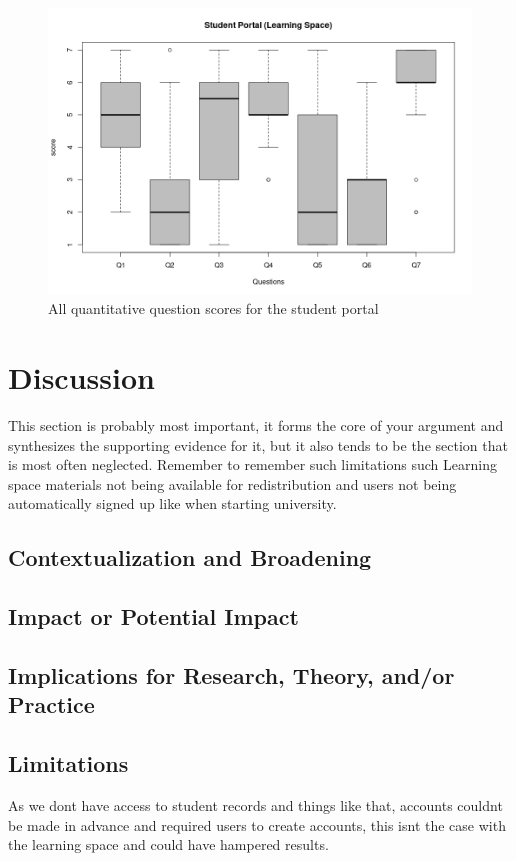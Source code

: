 \documentclass[lettersize,journal]{IEEEtran}
\begin{document}
\begin{figure}[h!]
	\includegraphics[width=\linewidth]{images/StudentPortalFull.png}
	\caption{All quantitative question scores for the student portal}
	\label{figure 4}
\end{figure}

\section{Discussion}

This section is probably most important, it forms the core of your argument and synthesizes the supporting evidence for it, but it also tends to be the section that is most often neglected. Remember to remember such limitations such Learning space materials not being available for redistribution and users not being automatically signed up like when starting university.

\subsection{Contextualization and Broadening}
\subsection{Impact or Potential Impact}
\subsection{Implications for Research, Theory, and/or Practice}
\subsection{Limitations}
As we dont have access to student records and things like that, accounts couldnt be made in advance and required users to create accounts,
this isnt the case with the learning space and could have hampered results.
\end{document}
